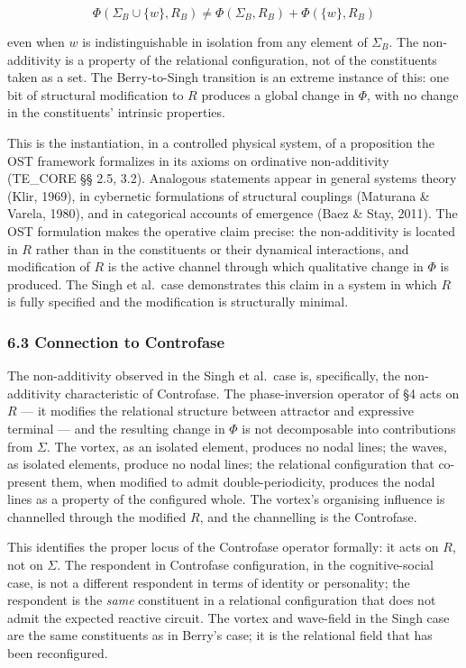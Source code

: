 \documentclass[
  11pt,
  a4paper,
]{article}
\begin{document}
\[ \Phi(\Sigma_B \cup \{w\}, R_B) \neq \Phi(\Sigma_B, R_B) + \Phi(\{w\}, R_B) \tag{6.2} \]

even when \(w\) is indistinguishable in isolation from any element of
\(\Sigma_B\). The non-additivity is a property of the relational
configuration, not of the constituents taken as a set. The
Berry-to-Singh transition is an extreme instance of this: one bit of
structural modification to \(R\) produces a global change in \(\Phi\),
with no change in the constituents' intrinsic properties.

This is the instantiation, in a controlled physical system, of a
proposition the OST framework formalizes in its axioms on ordinative
non-additivity (TE\_CORE §§ 2.5, 3.2). Analogous statements appear in
general systems theory (Klir, 1969), in cybernetic formulations of
structural couplings (Maturana \& Varela, 1980), and in categorical
accounts of emergence (Baez \& Stay, 2011). The OST formulation makes
the operative claim precise: the non-additivity is located in \(R\)
rather than in the constituents or their dynamical interactions, and
modification of \(R\) is the active channel through which qualitative
change in \(\Phi\) is produced. The Singh et al.~case demonstrates this
claim in a system in which \(R\) is fully specified and the modification
is structurally minimal.

\subsubsection{6.3 Connection to
Controfase}\label{connection-to-controfase}

The non-additivity observed in the Singh et al.~case is, specifically,
the non-additivity characteristic of Controfase. The phase-inversion
operator of §4 acts on \(R\) --- it modifies the relational structure
between attractor and expressive terminal --- and the resulting change
in \(\Phi\) is not decomposable into contributions from \(\Sigma\). The
vortex, as an isolated element, produces no nodal lines; the waves, as
isolated elements, produce no nodal lines; the relational configuration
that co-present them, when modified to admit double-periodicity,
produces the nodal lines as a property of the configured whole. The
vortex's organising influence is channelled through the modified \(R\),
and the channelling is the Controfase.

This identifies the proper locus of the Controfase operator formally: it
acts on \(R\), not on \(\Sigma\). The respondent in Controfase
configuration, in the cognitive-social case, is not a different
respondent in terms of identity or personality; the respondent is the
\emph{same} constituent in a relational configuration that does not
admit the expected reactive circuit. The vortex and wave-field in the
Singh case are the same constituents as in Berry's case; it is the
relational field that has been reconfigured.
\end{document}
